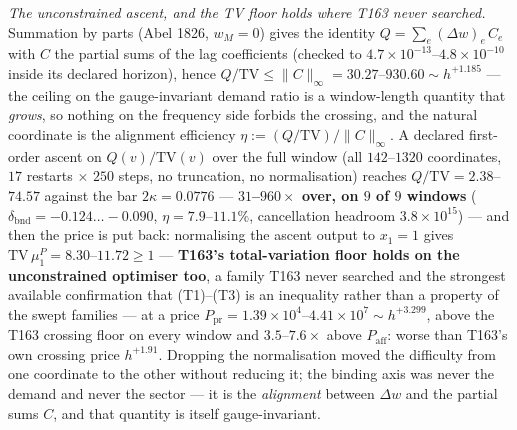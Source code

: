 \documentclass[11pt,a4paper]{article}
\begin{document}
\emph{The unconstrained ascent, and the TV floor holds where T163 never
searched.} Summation by parts (Abel 1826, $w_M=0$) gives the identity
$Q=\sum_e(\Delta w)_e\,C_e$ with $C$ the partial sums of the lag coefficients
(checked to $4.7\times10^{-13}$--$4.8\times10^{-10}$ inside its declared
horizon), hence $Q/\mathrm{TV}\le\|C\|_\infty=30.27$--$930.60\sim h^{+1.185}$
--- the ceiling on the gauge-invariant demand ratio is a window-length
quantity that \emph{grows}, so nothing on the frequency side forbids the
crossing, and the natural coordinate is the alignment efficiency
$\eta:=(Q/\mathrm{TV})/\|C\|_\infty$. A declared first-order ascent on
$Q(v)/\mathrm{TV}(v)$ over the full window (all $142$--$1320$ coordinates,
$17$ restarts $\times$ $250$ steps, no truncation, no normalisation) reaches
$Q/\mathrm{TV}=2.38$--$74.57$ against the bar $2\kappa=0.0776$ ---
\textbf{$31$--$960\times$ over, on $9$ of $9$ windows}
($\delta_{\mathrm{bnd}}=-0.124\ldots-0.090$, $\eta=7.9$--$11.1\%$,
cancellation headroom $3.8\times10^{15}$) --- and then the price is put back:
normalising the ascent output to $x_1=1$ gives
$\mathrm{TV}\,\mu^P_1=8.30$--$11.72\ge1$ --- \textbf{T163's total-variation
floor holds on the unconstrained optimiser too}, a family T163 never searched
and the strongest available confirmation that (T1)--(T3) is an inequality
rather than a property of the swept families --- at a price
$P_{\mathrm{pr}}=1.39\times10^{4}$--$4.41\times10^{7}\sim h^{+3.299}$, above
the T163 crossing floor on every window and $3.5$--$7.6\times$ above
$P_{\mathrm{aff}}$: worse than T163's own crossing price $h^{+1.91}$.
Dropping the normalisation moved the difficulty from one coordinate to the
other without reducing it; the binding axis was never the demand and never the
sector --- it is the \emph{alignment} between $\Delta w$ and the partial sums
$C$, and that quantity is itself gauge-invariant.
\end{document}
